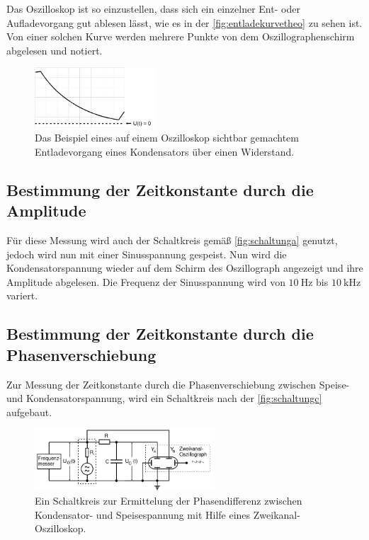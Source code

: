     \noindent Das Oszilloskop ist so einzustellen, dass sich ein einzelner Ent- oder Aufladevorgang gut ablesen lässt, wie es in der \autoref{fig:entladekurvetheo}
    zu sehen ist. Von einer solchen Kurve werden mehrere Punkte von dem Oszillographenschirm abgelesen und notiert.

    \begin{figure}
        \centering
        \includegraphics[width=0.4\textwidth]{bilder/Entladekurve.PNG}
        \caption{Das Beispiel eines auf einem Oszilloskop sichtbar gemachtem Entladevorgang eines Kondensators über einen Widerstand. \cite{anleitung}}
        \label{fig:entladekurvetheo}
    \end{figure}


\subsection{Bestimmung der Zeitkonstante durch die Amplitude}

    Für diese Messung wird auch der Schaltkreis gemäß \autoref{fig:schaltunga} genutzt, jedoch wird nun mit einer Sinusspannung gespeist. Nun wird die 
    Kondensatorspannung wieder auf dem Schirm des Oszillograph angezeigt und ihre Amplitude abgelesen. Die Frequenz der Sinusspannung wird von 
    $\SI{10}{\hertz}$ bis $\SI{10}{\kilo\hertz}$ variert. 


\subsection{Bestimmung der Zeitkonstante durch die Phasenverschiebung}

    Zur Messung der Zeitkonstante durch die Phasenverschiebung zwischen Speise- und Kondensatorspannung, wird ein Schaltkreis nach der \autoref{fig:schaltungc}
    aufgebaut. 

    \begin{figure}[H]
        \centering
        \includegraphics[width=0.6\textwidth]{bilder/aufbau_schaltungc.jpg}
        \caption{Ein Schaltkreis zur Ermittelung der Phasendifferenz zwischen Kondensator- und Speisespannung mit Hilfe eines Zweikanal-Oszilloskop. \cite{anleitung}}
        \label{fig:schaltungc}
    \end{figure}

